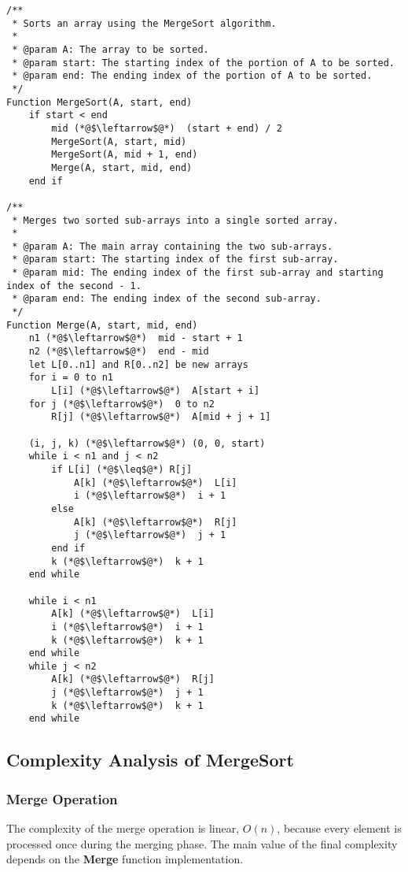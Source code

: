 \begin{lstlisting}[language=PseudoCode, label=lst:mergesort, caption=MergeSort and its Merge function]
/**
 * Sorts an array using the MergeSort algorithm.
 * 
 * @param A: The array to be sorted.
 * @param start: The starting index of the portion of A to be sorted.
 * @param end: The ending index of the portion of A to be sorted.
 */
Function MergeSort(A, start, end)
    if start < end
        mid (*@$\leftarrow$@*)  (start + end) / 2
        MergeSort(A, start, mid)
        MergeSort(A, mid + 1, end)
        Merge(A, start, mid, end)
    end if
    
/**
 * Merges two sorted sub-arrays into a single sorted array.
 * 
 * @param A: The main array containing the two sub-arrays.
 * @param start: The starting index of the first sub-array.
 * @param mid: The ending index of the first sub-array and starting index of the second - 1.
 * @param end: The ending index of the second sub-array.
 */
Function Merge(A, start, mid, end)
    n1 (*@$\leftarrow$@*)  mid - start + 1
    n2 (*@$\leftarrow$@*)  end - mid
    let L[0..n1] and R[0..n2] be new arrays
    for i = 0 to n1
        L[i] (*@$\leftarrow$@*)  A[start + i]
    for j (*@$\leftarrow$@*)  0 to n2
        R[j] (*@$\leftarrow$@*)  A[mid + j + 1]
    
    (i, j, k) (*@$\leftarrow$@*) (0, 0, start)
    while i < n1 and j < n2
        if L[i] (*@$\leq$@*) R[j]
            A[k] (*@$\leftarrow$@*)  L[i]
            i (*@$\leftarrow$@*)  i + 1
        else
            A[k] (*@$\leftarrow$@*)  R[j]
            j (*@$\leftarrow$@*)  j + 1
        end if
        k (*@$\leftarrow$@*)  k + 1
    end while
    
    while i < n1
        A[k] (*@$\leftarrow$@*)  L[i]
        i (*@$\leftarrow$@*)  i + 1
        k (*@$\leftarrow$@*)  k + 1
    end while
    while j < n2
        A[k] (*@$\leftarrow$@*)  R[j]
        j (*@$\leftarrow$@*)  j + 1
        k (*@$\leftarrow$@*)  k + 1
    end while
\end{lstlisting}

\subsection{Complexity Analysis of MergeSort}
\subsubsection{Merge Operation}
The complexity of the merge operation is linear, \(O(n)\), because every element is processed once during the merging phase. The main value of the final complexity depends on the \textbf{Merge} function implementation.

